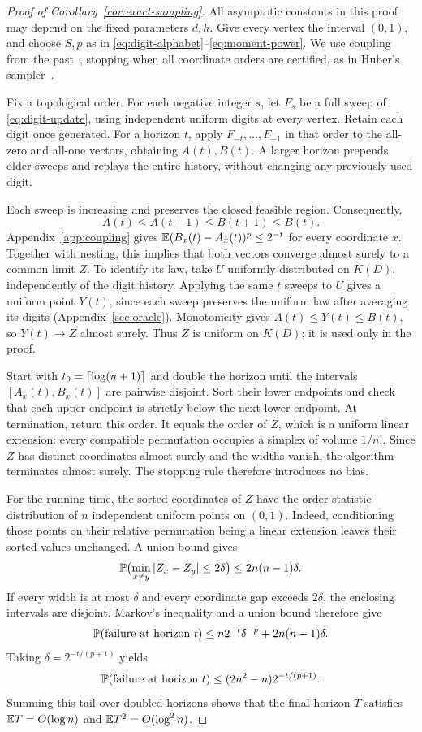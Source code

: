 \begin{proof}[Proof of Corollary~\ref{cor:exact-sampling}]
All asymptotic constants in this proof may depend on the fixed parameters
$d,h$.
Give every vertex the interval $(0,1)$, and choose $S,p$ as in
\eqref{eq:digit-alphabet}--\eqref{eq:moment-power}. We use coupling from
the past~\cite{propp-wilson}, stopping when all coordinate orders are
certified, as in Huber's sampler~\cite{huber-sampling}.

Fix a topological order. For each negative integer $s$, let $F_s$ be a
full sweep of \eqref{eq:digit-update}, using independent uniform digits
at every vertex. Retain each digit once generated. For a horizon $t$,
apply $F_{-t},\ldots,F_{-1}$ in that order to the all-zero and all-one
vectors, obtaining $A(t),B(t)$. A larger horizon prepends older sweeps
and replays the entire history, without changing any previously used
digit.

Each sweep is increasing and preserves the closed feasible region.
Consequently,
\[
A(t)\le A(t+1)\le B(t+1)\le B(t).
\]
Appendix~\ref{app:coupling} gives
$\mathbb E(B_x(t)-A_x(t))^p\le2^{-t}$ for every coordinate $x$.
Together with nesting, this implies that both vectors converge almost
surely to a common limit $Z$. To identify its law, take $U$ uniformly
distributed on $K(D)$, independently of the digit history. Applying the
same $t$ sweeps to $U$ gives a uniform point $Y(t)$, since each sweep
preserves the uniform law after averaging its digits
(Appendix~\ref{sec:oracle}). Monotonicity gives
$A(t)\le Y(t)\le B(t)$, so $Y(t)\to Z$ almost surely. Thus $Z$ is
uniform on $K(D)$; it is used only in the proof.

Start with $t_0=\left\lceil \log(n+1)\right\rceil$ and double the horizon until the
intervals $[A_x(t),B_x(t)]$ are pairwise disjoint. Sort their lower
endpoints and check that each upper endpoint is strictly below the next
lower endpoint. At termination, return this order. It equals the order
of $Z$, which is a uniform linear extension: every compatible
permutation occupies a simplex of volume $1/n!$. Since $Z$ has distinct
coordinates almost surely and the widths vanish, the algorithm
terminates almost surely. The stopping rule therefore introduces no
bias.

For the running time, the sorted coordinates of $Z$ have the
order-statistic distribution of $n$ independent uniform points on
$(0,1)$. Indeed, conditioning those points on their relative permutation
being a linear extension leaves their sorted values unchanged. A union
bound gives
\[
\mathbb P\bigl(\min_{x\ne y}|Z_x-Z_y|\le2\delta\bigr)
\le2n(n-1)\delta.
\]
If every width is at most $\delta$ and every coordinate gap exceeds
$2\delta$, the enclosing intervals are disjoint. Markov's inequality
and a union bound therefore give
\[
\mathbb P(\text{failure at horizon }t)
\le n2^{-t}\delta^{-p}+2n(n-1)\delta.
\]
Taking $\delta=2^{-t/(p+1)}$ yields
\begin{equation}\label{eq:exact-sampling-tail}
\mathbb P(\text{failure at horizon }t)
\le(2n^2-n)2^{-t/(p+1)}.
\end{equation}
Summing this tail over doubled horizons shows that the final horizon
$T$ satisfies $\mathbb E T=O(\log n)$ and
$\mathbb E T^2=O(\log^2 n)$.


\end{proof}
